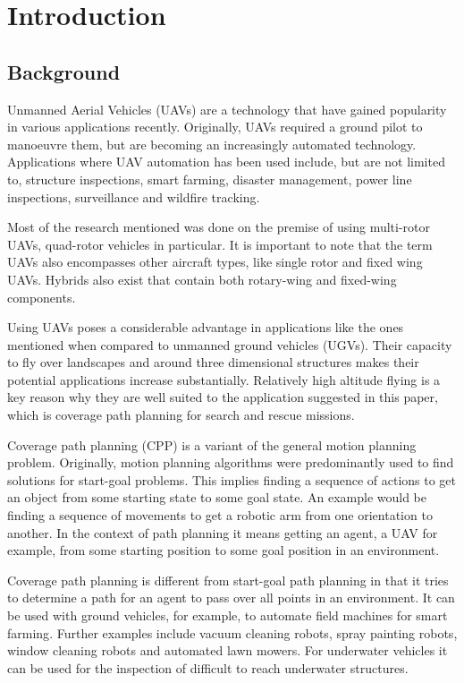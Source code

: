 \chapter{Introduction}
\label{chp:intro}


\section{Background}
\label{sec:bg}
Unmanned Aerial Vehicles (UAVs) are a technology that have gained popularity in various applications recently\cite{CPP-Survey-2019}. Originally, UAVs required a ground pilot to manoeuvre them, but are becoming an increasingly automated technology. Applications where UAV automation has been used include, but are not limited to, structure inspections\cite{Guerrero2013}, smart farming\cite{Lottes2017}, disaster management\cite{Maza2011}, power line inspections\cite{Chang2017}, surveillance\cite{Basilico2015} and wildfire tracking\cite{Pham2017}.

Most of the research mentioned was done on the premise of using multi-rotor UAVs, quad-rotor vehicles in particular. It is important to note that the term UAVs also encompasses other aircraft types, like single rotor and fixed wing UAVs. Hybrids also exist that contain both rotary-wing and fixed-wing components\cite{CPP-Survey-2019}.

Using UAVs poses a considerable advantage in applications like the ones mentioned when compared to unmanned ground vehicles (UGVs). Their capacity to fly over landscapes and around three dimensional structures makes their potential applications increase substantially. Relatively high altitude flying is a key reason why they are well suited to the application suggested in this paper, which is coverage path planning for search and rescue missions.

Coverage path planning (CPP) is a variant of the general motion planning problem. Originally, motion planning algorithms were predominantly used to find solutions for start-goal problems\cite{Choset2001}. This implies finding a sequence of actions to get an object from some starting state to some goal state. An example would be finding a sequence of movements to get a robotic arm from one orientation to another. In the context of path planning it means getting an agent, a UAV for example, from some starting position to some goal position in an environment\cite{Lynch2017}.

Coverage path planning is different from start-goal path planning in that it tries to determine a path for an agent to pass over all points in an environment\cite{Choset2001}. It can be used with ground vehicles, for example, to automate field machines for smart farming\cite{Hameed2014}. Further examples include vacuum cleaning robots, spray painting robots\cite{Atkar2005}, window cleaning robots\cite{Mir-Nasiri2018} and automated lawn mowers\cite{Arkin1999}. For underwater vehicles it can be used for the inspection of difficult to reach underwater structures\cite{Englot2012}. 

